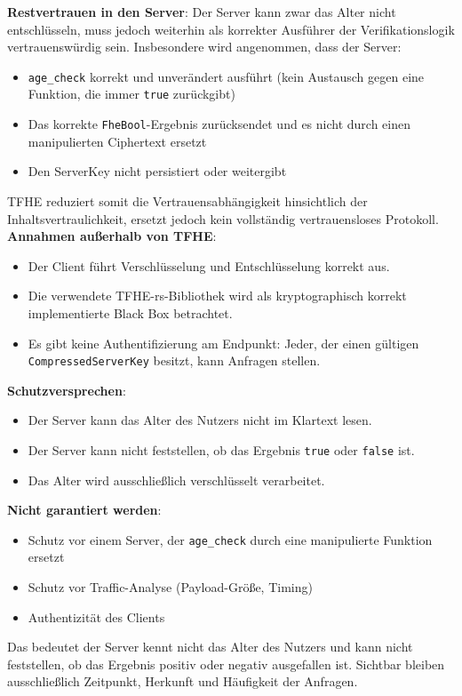 \textbf{Restvertrauen in den Server}:
Der Server kann zwar das Alter nicht entschlüsseln, muss jedoch weiterhin als korrekter Ausführer der Verifikationslogik vertrauenswürdig sein. Insbesondere wird angenommen, dass der Server:
\begin{itemize}
    \item \verb|age_check| korrekt und unverändert ausführt (kein Austausch gegen eine Funktion, die immer \verb|true| zurückgibt)
    \item Das korrekte \verb|FheBool|-Ergebnis zurücksendet und es nicht durch einen manipulierten Ciphertext ersetzt
    \item Den ServerKey nicht persistiert oder weitergibt
\end{itemize}
TFHE reduziert somit die Vertrauensabhängigkeit hinsichtlich der Inhaltsvertraulichkeit, ersetzt jedoch kein vollständig vertrauensloses Protokoll.
\newpage
\textbf{Annahmen außerhalb von TFHE}:
\begin{itemize}
    \item Der Client führt Verschlüsselung und Entschlüsselung korrekt aus.
    \item Die verwendete TFHE-rs-Bibliothek wird als kryptographisch korrekt implementierte Black Box betrachtet.
    \item Es gibt keine Authentifizierung am Endpunkt: Jeder, der einen gültigen \verb|CompressedServerKey| besitzt, kann Anfragen stellen.
\end{itemize}

\textbf{Schutzversprechen}:
\begin{itemize}
    \item Der Server kann das Alter des Nutzers nicht im Klartext lesen.
    \item Der Server kann nicht feststellen, ob das Ergebnis \verb|true| oder \verb|false| ist.
    \item Das Alter wird ausschließlich verschlüsselt verarbeitet.
\end{itemize}

\textbf{Nicht garantiert werden}:
\begin{itemize}
    \item Schutz vor einem Server, der \verb|age_check| durch eine manipulierte Funktion ersetzt
    \item Schutz vor Traffic-Analyse (Payload-Größe, Timing)
    \item Authentizität des Clients
\end{itemize}

Das bedeutet der Server kennt nicht das Alter des Nutzers und kann nicht feststellen, ob das Ergebnis positiv oder negativ ausgefallen ist. Sichtbar bleiben ausschließlich Zeitpunkt, Herkunft und Häufigkeit der Anfragen.

